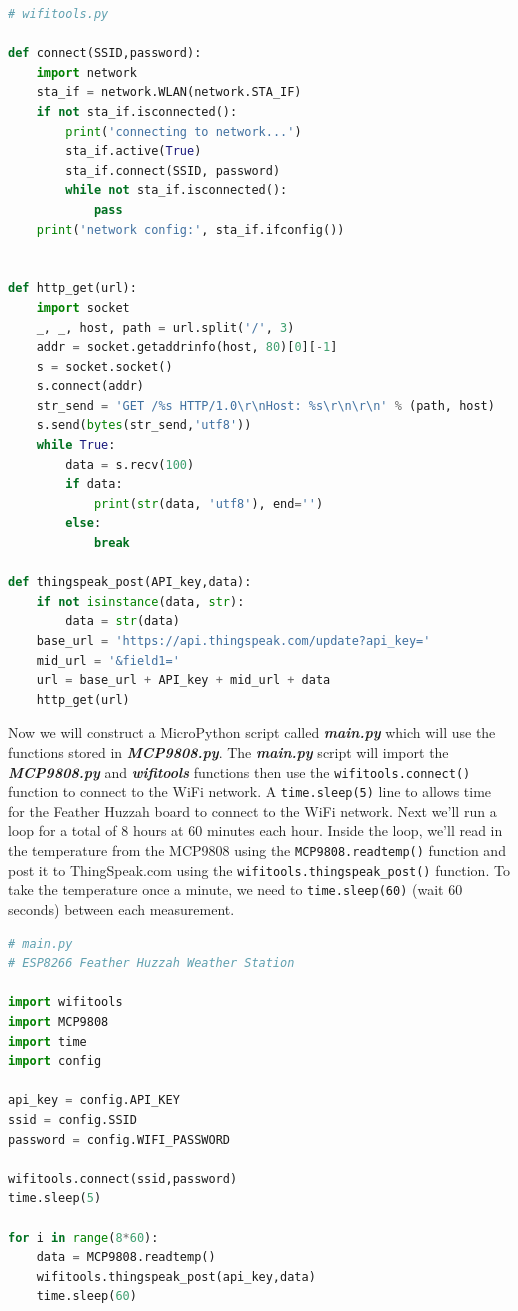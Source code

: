 \documentclass{book}
\begin{document}
\begin{lstlisting}[language=Python]
# wifitools.py

def connect(SSID,password):
    import network
    sta_if = network.WLAN(network.STA_IF)
    if not sta_if.isconnected():
        print('connecting to network...')
        sta_if.active(True)
        sta_if.connect(SSID, password)
        while not sta_if.isconnected():
            pass
    print('network config:', sta_if.ifconfig())

        
def http_get(url):
    import socket
    _, _, host, path = url.split('/', 3)
    addr = socket.getaddrinfo(host, 80)[0][-1]
    s = socket.socket()
    s.connect(addr)
    str_send = 'GET /%s HTTP/1.0\r\nHost: %s\r\n\r\n' % (path, host)
    s.send(bytes(str_send,'utf8'))
    while True:
        data = s.recv(100)
        if data:
            print(str(data, 'utf8'), end='')
        else:
            break

def thingspeak_post(API_key,data):
    if not isinstance(data, str):
        data = str(data)
    base_url = 'https://api.thingspeak.com/update?api_key='
    mid_url = '&field1='
    url = base_url + API_key + mid_url + data
    http_get(url)
\end{lstlisting}

Now we will construct a MicroPython script called
\textbf{\emph{main.py}} which will use the functions stored in
\textbf{\emph{MCP9808.py}}. The \textbf{\emph{main.py}} script will
import the \textbf{\emph{MCP9808.py}} and \textbf{\emph{wifitools}}
functions then use the \lstinline!wifitools.connect()! function to
connect to the WiFi network. A \lstinline!time.sleep(5)! line to allows
time for the Feather Huzzah board to connect to the WiFi network. Next
we'll run a loop for a total of 8 hours at 60 minutes each hour. Inside
the loop, we'll read in the temperature from the MCP9808 using the
\lstinline!MCP9808.readtemp()! function and post it to ThingSpeak.com
using the \lstinline!wifitools.thingspeak_post()! function. To take the
temperature once a minute, we need to \lstinline!time.sleep(60)! (wait
60 seconds) between each measurement.

\begin{lstlisting}[language=Python]
# main.py
# ESP8266 Feather Huzzah Weather Station

import wifitools
import MCP9808
import time
import config

api_key = config.API_KEY
ssid = config.SSID
password = config.WIFI_PASSWORD

wifitools.connect(ssid,password)
time.sleep(5)

for i in range(8*60):
    data = MCP9808.readtemp()
    wifitools.thingspeak_post(api_key,data)
    time.sleep(60)
\end{lstlisting}
\end{document}
